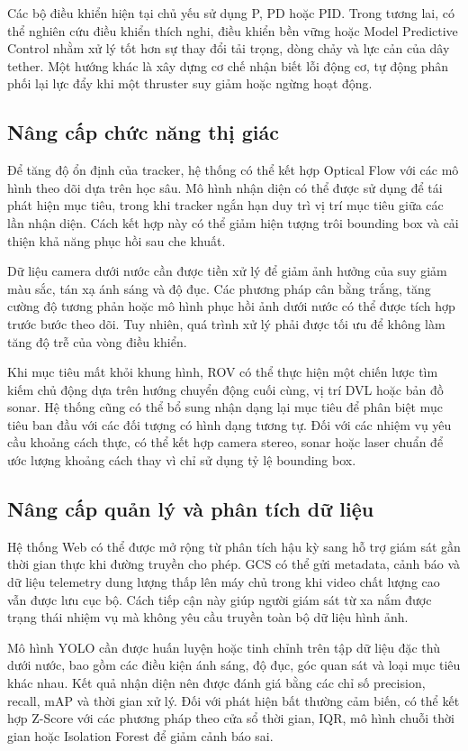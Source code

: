 \documentclass[../DoAn.tex]{subfiles}
\begin{document}
Các bộ điều khiển hiện tại chủ yếu sử dụng P, PD hoặc PID. Trong tương lai, có thể nghiên cứu điều khiển thích nghi, điều khiển bền vững hoặc Model Predictive Control nhằm xử lý tốt hơn sự thay đổi tải trọng, dòng chảy và lực cản của dây tether. Một hướng khác là xây dựng cơ chế nhận biết lỗi động cơ, tự động phân phối lại lực đẩy khi một thruster suy giảm hoặc ngừng hoạt động.

\subsection{Nâng cấp chức năng thị giác}

Để tăng độ ổn định của tracker, hệ thống có thể kết hợp Optical Flow với các mô hình theo dõi dựa trên học sâu. Mô hình nhận diện có thể được sử dụng để tái phát hiện mục tiêu, trong khi tracker ngắn hạn duy trì vị trí mục tiêu giữa các lần nhận diện. Cách kết hợp này có thể giảm hiện tượng trôi bounding box và cải thiện khả năng phục hồi sau che khuất.

Dữ liệu camera dưới nước cần được tiền xử lý để giảm ảnh hưởng của suy giảm màu sắc, tán xạ ánh sáng và độ đục. Các phương pháp cân bằng trắng, tăng cường độ tương phản hoặc mô hình phục hồi ảnh dưới nước có thể được tích hợp trước bước theo dõi. Tuy nhiên, quá trình xử lý phải được tối ưu để không làm tăng độ trễ của vòng điều khiển.

Khi mục tiêu mất khỏi khung hình, ROV có thể thực hiện một chiến lược tìm kiếm chủ động dựa trên hướng chuyển động cuối cùng, vị trí DVL hoặc bản đồ sonar. Hệ thống cũng có thể bổ sung nhận dạng lại mục tiêu để phân biệt mục tiêu ban đầu với các đối tượng có hình dạng tương tự. Đối với các nhiệm vụ yêu cầu khoảng cách thực, có thể kết hợp camera stereo, sonar hoặc laser chuẩn để ước lượng khoảng cách thay vì chỉ sử dụng tỷ lệ bounding box.

\subsection{Nâng cấp quản lý và phân tích dữ liệu}

Hệ thống Web có thể được mở rộng từ phân tích hậu kỳ sang hỗ trợ giám sát gần thời gian thực khi đường truyền cho phép. GCS có thể gửi metadata, cảnh báo và dữ liệu telemetry dung lượng thấp lên máy chủ trong khi video chất lượng cao vẫn được lưu cục bộ. Cách tiếp cận này giúp người giám sát từ xa nắm được trạng thái nhiệm vụ mà không yêu cầu truyền toàn bộ dữ liệu hình ảnh.

Mô hình YOLO cần được huấn luyện hoặc tinh chỉnh trên tập dữ liệu đặc thù dưới nước, bao gồm các điều kiện ánh sáng, độ đục, góc quan sát và loại mục tiêu khác nhau. Kết quả nhận diện nên được đánh giá bằng các chỉ số precision, recall, mAP và thời gian xử lý. Đối với phát hiện bất thường cảm biến, có thể kết hợp Z-Score với các phương pháp theo cửa sổ thời gian, IQR, mô hình chuỗi thời gian hoặc Isolation Forest để giảm cảnh báo sai.
\end{document}
